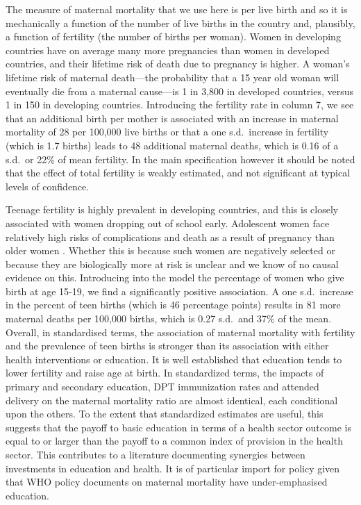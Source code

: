 \documentclass{article}[12pt,subeqn]
\begin{document}
\begin{spacing}{1.4}
The measure of maternal mortality that we use here is per live birth and so it is 
mechanically a function of the number of live births in the country and, plausibly, 
a function of fertility (the number of births per woman). Women in developing 
countries have on average many more pregnancies than women in developed countries, 
and their lifetime risk of death due to pregnancy is higher. A woman's lifetime 
risk of maternal death---the probability that a 15 year old woman will eventually 
die from a maternal cause---is 1 in 3,800 in developed countries, versus 1 in 150 
in developing countries. Introducing the fertility rate in column 7, we see that an 
additional birth per mother is associated with an increase in maternal mortality of
28 per 100,000 live births or that a one s.d.\ increase in fertility (which is 1.7 
births) leads to 48 additional maternal deaths, which is 0.16 of a s.d.\ or 22\% of 
mean fertility. In the main specification however it should be noted that the 
effect of total fertility is weakly estimated, and not significant at typical levels 
of confidence.

Teenage fertility is highly prevalent in developing countries, and this is 
closely associated with women dropping out of school early. Adolescent women face 
relatively high risks of complications and death as a result of pregnancy than 
older women \citep{Condeetal2005, Pattonetal2009}.  Whether this is because such 
women are negatively selected or because they are biologically more at risk is 
unclear and we know of no causal evidence on this. Introducing into the model the 
percentage of women who give birth at age 15-19, we find a significantly positive 
association. A one s.d.\ increase in the percent of teen births (which is 46 
percentage points) results in 81 more maternal deaths per 100,000 births, which is 
0.27 s.d.\ and 37\% of the mean. Overall, in standardised terms, the association 
of maternal mortality with fertility and the prevalence of teen births is stronger 
than its association with either health interventions or education. It is well 
established that education tends to lower fertility and raise age at birth.  In 
standardized terms, the impacts of primary and secondary education, DPT 
immunization rates and attended delivery on the maternal mortality ratio are almost
identical, each conditional upon the others. To the extent that standardized 
estimates are useful, this suggests that the payoff to basic education in terms of 
a health sector outcome is equal to or larger than the payoff to a common index of 
provision in the health sector. This contributes to a literature documenting 
synergies between investments in education and health.  It is of particular import 
for policy given that WHO policy documents on maternal mortality have 
under-emphasised education.


\end{spacing}
\end{document}
